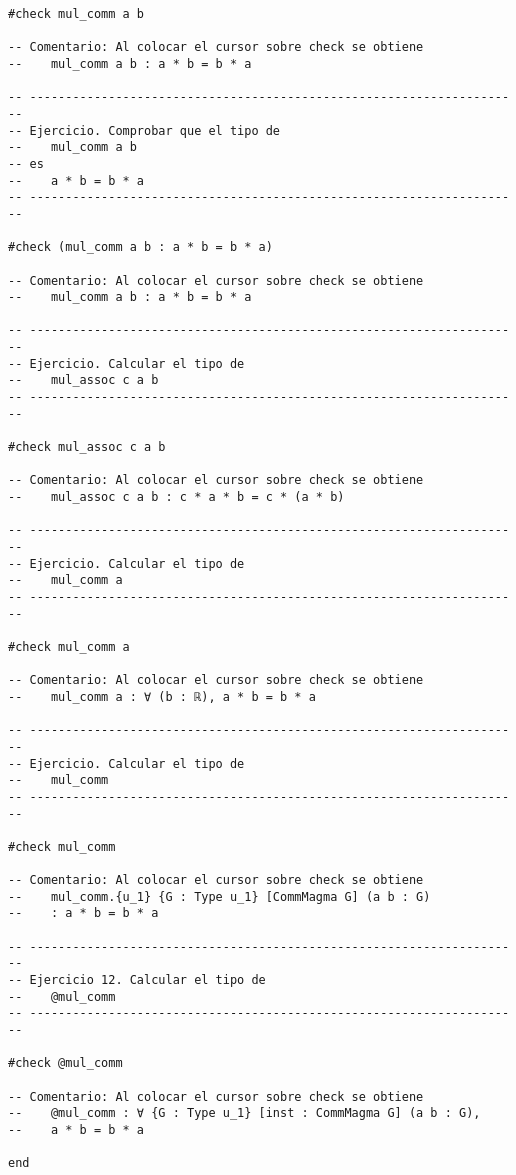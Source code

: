 \begin{verbatim}
#check mul_comm a b

-- Comentario: Al colocar el cursor sobre check se obtiene
--    mul_comm a b : a * b = b * a

-- ---------------------------------------------------------------------
-- Ejercicio. Comprobar que el tipo de
--    mul_comm a b
-- es
--    a * b = b * a
-- ---------------------------------------------------------------------

#check (mul_comm a b : a * b = b * a)

-- Comentario: Al colocar el cursor sobre check se obtiene
--    mul_comm a b : a * b = b * a

-- ---------------------------------------------------------------------
-- Ejercicio. Calcular el tipo de
--    mul_assoc c a b
-- ---------------------------------------------------------------------

#check mul_assoc c a b

-- Comentario: Al colocar el cursor sobre check se obtiene
--    mul_assoc c a b : c * a * b = c * (a * b)

-- ---------------------------------------------------------------------
-- Ejercicio. Calcular el tipo de
--    mul_comm a
-- ---------------------------------------------------------------------

#check mul_comm a

-- Comentario: Al colocar el cursor sobre check se obtiene
--    mul_comm a : ∀ (b : ℝ), a * b = b * a

-- ---------------------------------------------------------------------
-- Ejercicio. Calcular el tipo de
--    mul_comm
-- ---------------------------------------------------------------------

#check mul_comm

-- Comentario: Al colocar el cursor sobre check se obtiene
--    mul_comm.{u_1} {G : Type u_1} [CommMagma G] (a b : G)
--    : a * b = b * a

-- ---------------------------------------------------------------------
-- Ejercicio 12. Calcular el tipo de
--    @mul_comm
-- ---------------------------------------------------------------------

#check @mul_comm

-- Comentario: Al colocar el cursor sobre check se obtiene
--    @mul_comm : ∀ {G : Type u_1} [inst : CommMagma G] (a b : G),
--    a * b = b * a

end
\end{verbatim}

